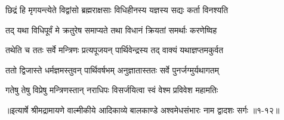 \twolineshloka
{छिद्रं हि मृगयन्त्येते विद्वांसो ब्रह्मराक्षसाः}
{विधिहीनस्य यज्ञस्य सद्यः कर्ता विनश्यति} %

\twolineshloka
{तद् यथा विधिपूर्वं मे क्रतुरेष समाप्यते}
{तथा विधानं क्रियतां समर्थाः करणेष्विह} %

\twolineshloka
{तथेति च ततः सर्वे मन्त्रिणः प्रत्यपूजयन्}
{पार्थिवेन्द्रस्य तद् वाक्यं यथाज्ञप्तमकुर्वत} %

\twolineshloka
{ततो द्विजास्ते धर्मज्ञमस्तुवन् पार्थिवर्षभम्}
{अनुज्ञातास्ततः सर्वे पुनर्जग्मुर्यथागतम्} %

\twolineshloka
{गतेषु तेषु विप्रेषु मन्त्रिणस्तान् नराधिपः}
{विसर्जयित्वा स्वं वेश्म प्रविवेश महामतिः} %


॥इत्यार्षे श्रीमद्रामायणे वाल्मीकीये आदिकाव्ये बालकाण्डे अश्वमेधसंभारः नाम द्वादशः सर्गः ॥१-१२॥
